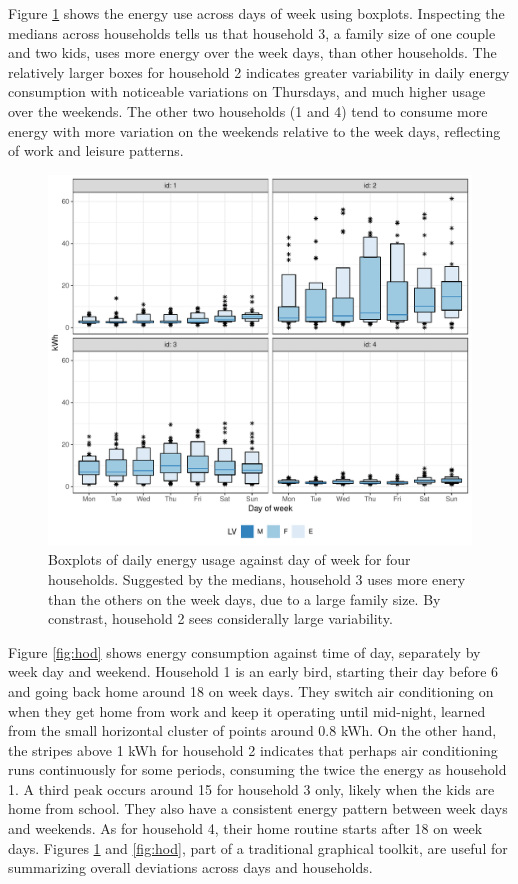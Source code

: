\documentclass[12pt]{article}
\begin{document}
Figure \ref{fig:dow} shows the energy use across days of week using boxplots. Inspecting the medians across households tells us that household 3, a family size of one couple and two kids, uses more energy over the week days, than other households. The relatively larger boxes for household 2 indicates greater variability in daily energy consumption with noticeable variations on Thursdays, and much higher usage over the weekends. The other two households (1 and 4) tend to consume more energy with more variation on the weekends relative to the week days, reflecting of work and leisure patterns.

\begin{figure}

{\centering \includegraphics[width=\textwidth]{figure/dow-1} 

}

\caption{Boxplots of daily energy usage against day of week for four households. Suggested by the medians, household 3 uses more enery than the others on the week days, due to a large family size. By constrast, household 2 sees considerally large variability.}\label{fig:dow}
\end{figure}

Figure \ref{fig:hod} shows energy consumption against time of day, separately by week day and weekend. Household 1 is an early bird, starting their day before 6 and going back home around 18 on week days. They switch air conditioning on when they get home from work and keep it operating until mid-night, learned from the small horizontal cluster of points around 0.8 kWh. On the other hand, the stripes above 1 kWh for household 2 indicates that perhaps air conditioning runs continuously for some periods, consuming the twice the energy as household 1. A third peak occurs around 15 for household 3 only, likely when the kids are home from school. They also have a consistent energy pattern between week days and weekends. As for household 4, their home routine starts after 18 on week days. Figures \ref{fig:dow} and \ref{fig:hod}, part of a traditional graphical toolkit, are useful for summarizing overall deviations across days and households.
\end{document}
